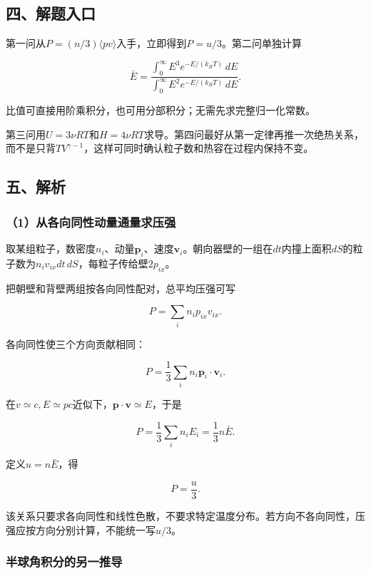 \documentclass[12pt,a4paper,fontset=fandol]{ctexart}
\begin{document}
\subsection{四、解题入口}\label{ux56dbux89e3ux9898ux5165ux53e3-6}

第一问从\(P=(n/3)\langle pv\rangle\)入手，立即得到\(P=u/3\)。第二问单独计算

\[
\bar E=
\frac{\int_0^\infty E^3e^{-E/(k_BT)}\,dE}
{\int_0^\infty E^2e^{-E/(k_BT)}\,dE}.
\]

比值可直接用阶乘积分，也可用分部积分；无需先求完整归一化常数。

第三问用\(U=3\nu RT\)和\(H=4\nu RT\)求导。第四问最好从第一定律再推一次绝热关系，而不是只背\(TV^{\gamma-1}\)，这样可同时确认粒子数和热容在过程内保持不变。

\subsection{五、解析}\label{ux4e94ux89e3ux6790-6}

\subsubsection{（1）从各向同性动量通量求压强}\label{ux4eceux5404ux5411ux540cux6027ux52a8ux91cfux901aux91cfux6c42ux538bux5f3a}

取某组粒子，数密度\(n_i\)、动量\(\boldsymbol p_i\)、速度\(\boldsymbol v_i\)。朝向器壁的一组在\(dt\)内撞上面积\(dS\)的粒子数为\(n_iv_{ix}dt\,dS\)，每粒子传给壁\(2p_{ix}\)。

把朝壁和背壁两组按各向同性配对，总平均压强可写

\[
P=\sum_i n_i p_{ix}v_{ix}.
\]

各向同性使三个方向贡献相同：

\[
P=\frac13\sum_i n_i\boldsymbol p_i\cdot\boldsymbol v_i.
\]

在\(v\simeq c,E\simeq pc\)近似下，\(\boldsymbol p\cdot\boldsymbol v\simeq E\)，于是

\[
P=\frac13\sum_i n_iE_i
=\frac13n\bar E.
\]

定义\(u=n\bar E\)，得

\[
\boxed{P=\frac u3}.
\]

该关系只要求各向同性和线性色散，不要求特定温度分布。若方向不各向同性，压强应按方向分别计算，不能统一写\(u/3\)。

\subsubsection{半球角积分的另一推导}\label{ux534aux7403ux89d2ux79efux5206ux7684ux53e6ux4e00ux63a8ux5bfc}
\end{document}
